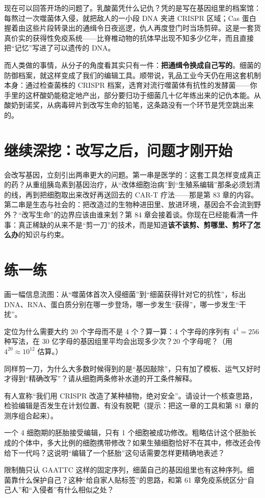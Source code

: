 现在可以回答开场的问题了。乳酸菌凭什么记仇？凭的是写在基因组里的档案馆：每熬过一次噬菌体入侵，就把敌人的一小段 DNA 夹进 CRISPR 区域；Cas 蛋白握着由这些片段转录出的通缉令日夜巡逻，仇人再度登门时当场剪碎。这是一套货真价实的获得性免疫系统——比脊椎动物的抗体早出现不知多少亿年，而且直接把“记忆”写进了可以遗传的 DNA。

而人类做的事情，从分子的角度看其实只有一件：\textbf{把通缉令换成自己写的}。细菌的防御档案，就这样变成了我们的编辑工具。顺带说，乳品工业今天仍在用这套机制本身：通过检查菌株的 CRISPR 档案，选育对流行噬菌体有抗性的发酵菌——你手里的这杯酸奶能稳定地产出，部分要归功于细菌几十亿年练出来的记仇本能。从酸奶到诺奖，从病毒碎片到改写生命的铅笔，这条路没有一个环节是凭空跳出来的。

\section{继续深挖：改写之后，问题才刚开始}

会改写基因，立刻引出两串更大的问题。第一串是医学的：这套工具怎样变成真正的药？从重组胰岛素到基因治疗，从“改体细胞治病”到“生殖系编辑”那条必须划清的线，再到把细胞取出来改好再送回去的 CAR-T 疗法——那是第 83 章的内容。第二串是生态与社会的：把改造过的生物种进田里、放进环境，基因会不会流到野外？“改写生命”的边界应该由谁来划？第 84 章会接着谈。你现在已经能看清一件事：真正稀缺的从来不是“剪一刀”的技术，而是知道\textbf{该不该剪、剪哪里、剪坏了怎么办}的知识与约束。

\section*{练一练}

\begin{sikaoti}
\item 画一幅信息流图：从“噬菌体首次入侵细菌”到“细菌获得针对它的抗性”，标出 DNA、RNA、蛋白质分别在哪一步登场，哪一步发生“获得”，哪一步发生“干扰”。
\item 定位为什么需要大约 20 个字母而不是 4 个？算一算：4 个字母的序列有 $4^4=256$ 种写法，在 30 亿字母的基因组里平均会出现多少次？20 个字母呢？（用 $4^{20}\approx 10^{12}$ 估算。）
\item 同样剪一刀，为什么大多数时候得到的是“基因敲除”，只有加了模板、运气又好时才得到“精确改写”？请从细胞两条修补水道的开工条件解释。
\item 有人宣称“我们用 CRISPR 改造了某种植物，绝对安全”。请设计一个核查思路，检验编辑是否发生在计划位置、有没有脱靶（提示：把这一章的工具和第 81 章的测序组合起来）。
\item 一个 4 细胞期的胚胎接受编辑，只有 1 个细胞被成功修改。粗略估计这个胚胎长成的个体中，多大比例的细胞携带修改？如果生殖细胞恰好不在其中，修改还会传给下一代吗？这说明“编辑了一个胚胎”这句话需要怎样更精确地表述？
\item 限制酶只认 GAATTC 这样的固定序列，细菌自己的基因组里也有这种序列。细菌靠什么保护自己？这种“给自家人贴标签”的思路，和第 61 章免疫系统区分“自己人”和“入侵者”有什么相似之处？
\end{sikaoti}
